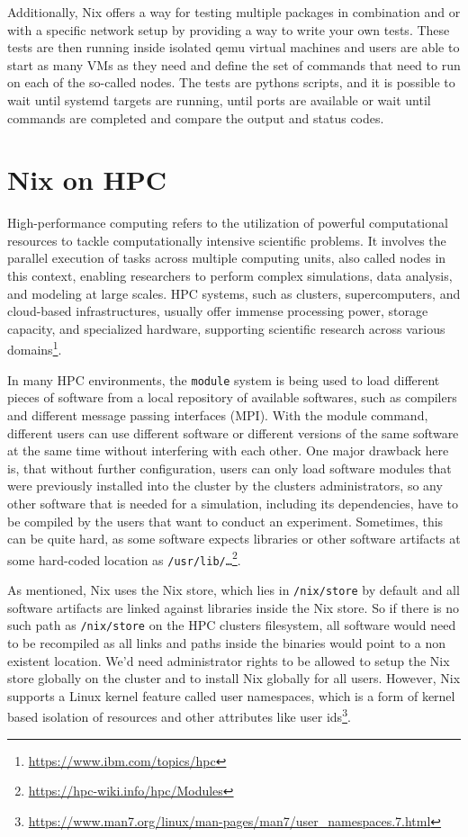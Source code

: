 \documentclass[conference,final,a4paper]{IEEEtran}
\begin{document}
Additionally, Nix offers a way for testing multiple packages in combination and or with a specific network setup by providing a way to write your own tests.
These tests are then running inside isolated qemu virtual machines and users are able to start as many VMs as they need and define the set of commands that need to run on each of the so-called nodes.
The tests are pythons scripts, and it is possible to wait until systemd targets are running, until ports are available or wait until commands are completed and compare the output and status codes.

\section{Nix on HPC}\label{sec:nix-on-hpc}

High-performance computing refers to the utilization of powerful computational resources to tackle computationally intensive scientific problems.
It involves the parallel execution of tasks across multiple computing units, also called nodes in this context, enabling researchers to perform complex simulations, data analysis, and modeling at large scales.
HPC systems, such as clusters, supercomputers, and cloud-based infrastructures, usually offer immense processing power, storage capacity, and specialized hardware, supporting scientific research across various domains\footnote{\url{https://www.ibm.com/topics/hpc}}.

In many HPC environments, the \texttt{module} system is being used to load different pieces of software from a local repository of available softwares, such as compilers and different message passing interfaces (MPI).
With the module command, different users can use different software or different versions of the same software at the same time without interfering with each other.
One major drawback here is, that without further configuration, users can only load software modules that were previously installed into the cluster by the clusters administrators, so any other software that is needed for a simulation, including its dependencies, have to be compiled by the users that want to conduct an experiment.
Sometimes, this can be quite hard, as some software expects libraries or other software artifacts at some hard-coded location as \texttt{/usr/lib/\ldots}\footnote{\url{https://hpc-wiki.info/hpc/Modules}}.

As mentioned, Nix uses the Nix store, which lies in \texttt{/nix/store} by default and all software artifacts are linked against libraries inside the Nix store.
So if there is no such path as \texttt{/nix/store} on the HPC clusters filesystem, all software would need to be recompiled as all links and paths inside the binaries would point to a non existent location.
We'd need administrator rights to be allowed to setup the Nix store globally on the cluster and to install Nix globally for all users.
However, Nix supports a Linux kernel feature called user namespaces, which is a form of kernel based isolation of resources and other attributes like user ids\footnote{\url{https://www.man7.org/linux/man-pages/man7/user_namespaces.7.html}}.
\end{document}
